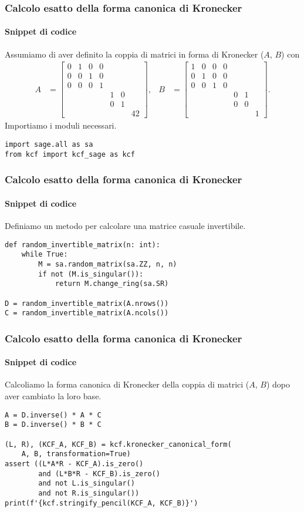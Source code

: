 \begin{frame}[fragile]
	\frametitle{Calcolo esatto della forma canonica di Kronecker}
	\framesubtitle{Snippet di codice}
	Assumiamo di aver definito la coppia di matrici in forma di Kronecker ($A$, $B$) con
	\begin{align*}
		A &=
		\begin{bmatrix}
			0 & 1 & 0 & 0 \\
			0 & 0 & 1 & 0 \\
			0 & 0 & 0 & 1 \\
			& & & & 1 & 0 \\
			& & & & 0 & 1 \\
			& & & & & & 42
		\end{bmatrix}, &
		B &=
		\begin{bmatrix}
			1 & 0 & 0 & 0 \\
			0 & 1 & 0 & 0 \\
			0 & 0 & 1 & 0 \\
			& & & & 0 & 1 \\
			& & & & 0 & 0 \\
			& & & & & & 1
		\end{bmatrix}.
	\end{align*}
	Importiamo i moduli necessari.
	\begin{verbatim}
import sage.all as sa
from kcf import kcf_sage as kcf
	\end{verbatim}
\end{frame}


\begin{frame}[fragile]
	\frametitle{Calcolo esatto della forma canonica di Kronecker}
	\framesubtitle{Snippet di codice}
	Definiamo un metodo per calcolare una matrice casuale invertibile.
	\begin{verbatim}
def random_invertible_matrix(n: int):
	while True:
		M = sa.random_matrix(sa.ZZ, n, n)
		if not (M.is_singular()):
			return M.change_ring(sa.SR)

D = random_invertible_matrix(A.nrows())
C = random_invertible_matrix(A.ncols())
	\end{verbatim}
\end{frame}


\begin{frame}[fragile]
	\frametitle{Calcolo esatto della forma canonica di Kronecker}
	\framesubtitle{Snippet di codice}
	Calcoliamo la forma canonica di Kronecker della coppia di matrici ($A$, $B$) dopo aver
	cambiato la loro base.
	\begin{verbatim}
A = D.inverse() * A * C
B = D.inverse() * B * C

(L, R), (KCF_A, KCF_B) = kcf.kronecker_canonical_form(
	A, B, transformation=True)
assert ((L*A*R - KCF_A).is_zero()
		and (L*B*R - KCF_B).is_zero()
		and not L.is_singular()
		and not R.is_singular())
print(f'{kcf.stringify_pencil(KCF_A, KCF_B)}')
\end{verbatim}
\end{frame}

